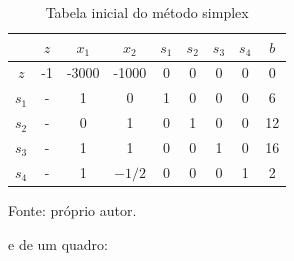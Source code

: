         \begin{table}[H]
            \centering
            \caption{Tabela inicial do método simplex}
            \begin{tabular}{|c|c|c|c|c|c|c|c|c|}
                \hline
                        & $z$   & $x_1$ & $x_2$ & $s_1$ & $s_2$ & $s_3$ & $s_4$ & $b$   \\ \hline
                $z$     & -1    & -3000 & -1000 & 0     & 0     & 0     & 0     & 0     \\ \hline
                $s_1$   & -     & 1     & 0     & 1     & 0     & 0     & 0     & 6     \\ \hline
                $s_2$   & -     & 0     & 1     & 0     & 1     & 0     & 0     & 12    \\ \hline
                $s_3$   & -     & 1     & 1     & 0     & 0     & 1     & 0     & 16    \\ \hline
                $s_4$   & -     & 1     & $-1/2$& 0     & 0     & 0     & 1     & 2     \\ \hline
            \end{tabular}
            \par \footnotesize Fonte: próprio autor.
            \label{tab:5_4-tabela_inicial}
        \end{table}
    
        e de um quadro:

